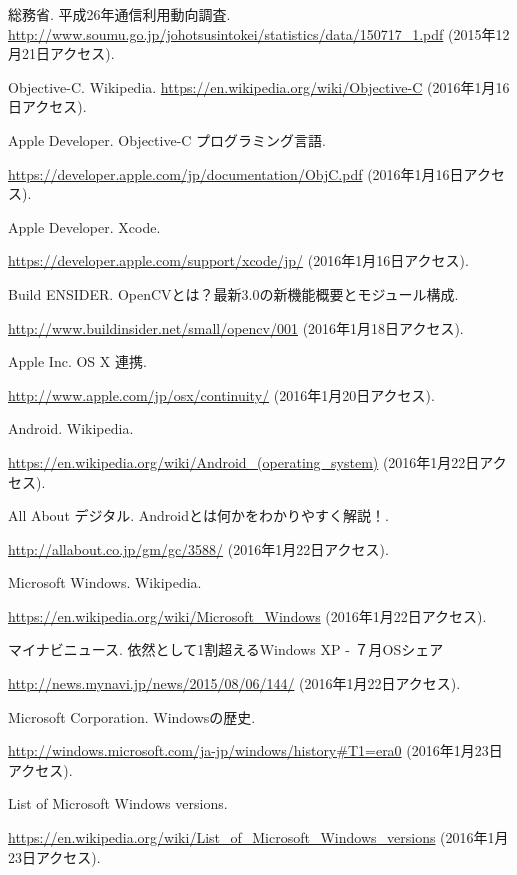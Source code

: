 \def\line{-\hspace*{-.7zw}-}

\begin{thebibliography}{99}

総務省. 平成26年通信利用動向調査.
\url{http://www.soumu.go.jp/johotsusintokei/statistics/data/150717_1.pdf}
(2015年12月21日アクセス).

Objective-C. Wikipedia.
\url{https://en.wikipedia.org/wiki/Objective-C}
(2016年1月16日アクセス).

Apple Developer. Objective-C プログラミング言語.

\url{https://developer.apple.com/jp/documentation/ObjC.pdf}
(2016年1月16日アクセス).

Apple Developer. Xcode.

\url{https://developer.apple.com/support/xcode/jp/}
(2016年1月16日アクセス).

Build ENSIDER. OpenCVとは？最新3.0の新機能概要とモジュール構成.

\url{http://www.buildinsider.net/small/opencv/001}
(2016年1月18日アクセス).

Apple Inc. OS X 連携.

\url{http://www.apple.com/jp/osx/continuity/}
(2016年1月20日アクセス).

Android. Wikipedia.

\url{https://en.wikipedia.org/wiki/Android_(operating_system)}
(2016年1月22日アクセス).

All About デジタル. Androidとは何かをわかりやすく解説！.

\url{http://allabout.co.jp/gm/gc/3588/}
(2016年1月22日アクセス).

Microsoft Windows. Wikipedia.

\url{https://en.wikipedia.org/wiki/Microsoft_Windows}
(2016年1月22日アクセス).

マイナビニュース. 依然として1割超えるWindows XP - ７月OSシェア

\url{http://news.mynavi.jp/news/2015/08/06/144/}
(2016年1月22日アクセス).

Microsoft Corporation. Windowsの歴史.

\url{http://windows.microsoft.com/ja-jp/windows/history#T1=era0}
(2016年1月23日アクセス).

List of Microsoft Windows versions.

\url{https://en.wikipedia.org/wiki/List_of_Microsoft_Windows_versions}
(2016年1月23日アクセス).


\end{thebibliography}
